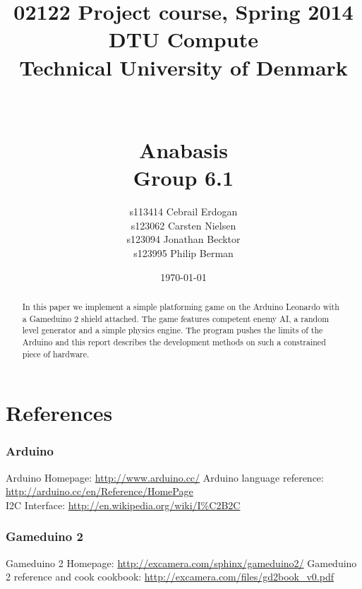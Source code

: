 \documentclass[12pt]{report}
\title{02122 Project course, Spring 2014 \\
DTU Compute \\
Technical University of Denmark \\~\\~\\ Anabasis \\ Group 6.1}
\author{s113414 Cebrail Erdogan \\
        s123062 Carsten Nielsen \\
        s123094 Jonathan Becktor\\
        s123995 Philip Berman   \\  }
\date{\today}
\begin{document}
\pagestyle{headings}



\maketitle

\begin{abstract}
In this paper we implement a simple platforming game on the Arduino Leonardo with a Gameduino 2 shield attached. The game features competent enemy AI, a random level generator and a simple physics engine. The program pushes the limits of the Arduino and this report describes the development methods on such a constrained piece of hardware.
\end{abstract}


\tableofcontents

\newpage



\newpage

















\chapter{References}

\subsection*{Arduino}
Arduino Homepage: \url{http://www.arduino.cc/}
Arduino language reference: \url{http://arduino.cc/en/Reference/HomePage}\\
I2C Interface: \url{http://en.wikipedia.org/wiki/I%C2B2C}

\subsection*{Gameduino 2}
Gameduino 2 Homepage: \url{http://excamera.com/sphinx/gameduino2/}
Gameduino 2 reference and cook cookbook: \url{http://excamera.com/files/gd2book\_v0.pdf}
\end{document}
